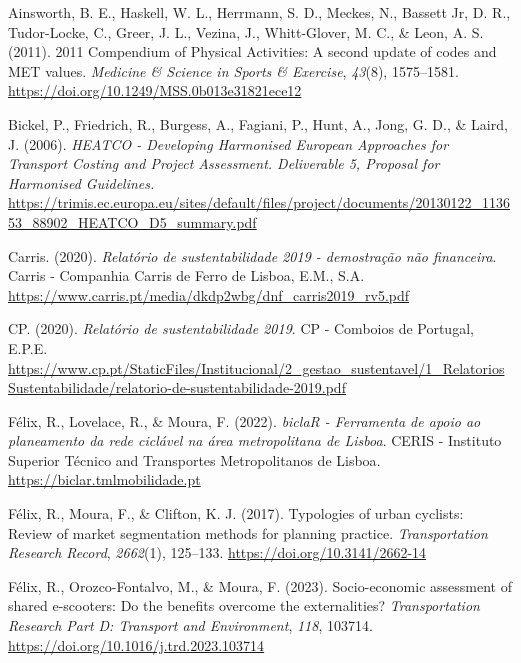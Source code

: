 \documentclass[review, doubleblind, 3p,
authoryear]{elsarticle} %
\newlength{\cslhangindent}
\newlength{\cslentryspacingunit} %
\newenvironment{CSLReferences}[2] %
 {%
  \setlength{\parindent}{0pt}
  \ifodd #1
  \let\oldpar\par
  \def\par{\hangindent=\cslhangindent\oldpar}
  \fi
  \setlength{\parskip}{#2\cslentryspacingunit}
 }%
 {}
\begin{document}
\hypertarget{refs}{}
\begin{CSLReferences}{1}{0}
\leavevmode{}%
Ainsworth, B. E., Haskell, W. L., Herrmann, S. D., Meckes, N., Bassett
Jr, D. R., Tudor-Locke, C., Greer, J. L., Vezina, J., Whitt-Glover, M.
C., \& Leon, A. S. (2011). {2011 Compendium of Physical Activities: A
second update of codes and MET values}. \emph{Medicine \& Science in
Sports \& Exercise}, \emph{43}(8), 1575--1581.
\url{https://doi.org/10.1249/MSS.0b013e31821ece12}

\leavevmode{}%
Bickel, P., Friedrich, R., Burgess, A., Fagiani, P., Hunt, A., Jong, G.
D., \& Laird, J. (2006). \emph{{HEATCO - Developing Harmonised European
Approaches for Transport Costing and Project Assessment. Deliverable 5,
Proposal for Harmonised Guidelines.}}
\url{https://trimis.ec.europa.eu/sites/default/files/project/documents/20130122_113653_88902_HEATCO_D5_summary.pdf}

\leavevmode{}%
Carris. (2020). \emph{Relatório de sustentabilidade 2019 - demostração
não financeira}. {Carris - Companhia Carris de Ferro de Lisboa, E.M.,
S.A.} \url{https://www.carris.pt/media/dkdp2wbg/dnf_carris2019_rv5.pdf}

\leavevmode{}%
CP. (2020). \emph{Relatório de sustentabilidade 2019}. {CP - Comboios de
Portugal, E.P.E.}
\url{https://www.cp.pt/StaticFiles/Institucional/2_gestao_sustentavel/1_RelatoriosSustentabilidade/relatorio-de-sustentabilidade-2019.pdf}

\leavevmode{}%
Félix, R., Lovelace, R., \& Moura, F. (2022). \emph{{biclaR - Ferramenta
de apoio ao planeamento da rede ciclável na área metropolitana de
Lisboa}}. {CERIS - Instituto Superior Técnico and Transportes
Metropolitanos de Lisboa}. \url{https://biclar.tmlmobilidade.pt}

\leavevmode{}%
Félix, R., Moura, F., \& Clifton, K. J. (2017). Typologies of urban
cyclists: Review of market segmentation methods for planning practice.
\emph{Transportation Research Record}, \emph{2662}(1), 125--133.
\url{https://doi.org/10.3141/2662-14}

\leavevmode{}%
Félix, R., Orozco-Fontalvo, M., \& Moura, F. (2023). Socio-economic
assessment of shared e-scooters: Do the benefits overcome the
externalities? \emph{Transportation Research Part D: Transport and
Environment}, \emph{118}, 103714.
\url{https://doi.org/10.1016/j.trd.2023.103714}


\end{CSLReferences}
\end{document}
